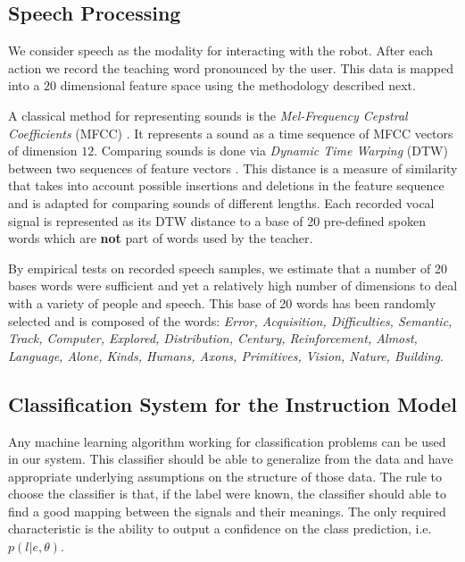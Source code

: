 \subsection{Speech Processing}

We consider speech as the modality for interacting with the robot. After each action we record the teaching word pronounced by the user. This data is mapped into a $20$ dimensional feature space using the methodology described next.  

A classical method for representing sounds is the \textit{Mel-Frequency Cepstral Coefficients} (MFCC) \cite{zheng2001comparison}. It represents a sound as a time sequence of MFCC vectors of dimension $12$. Comparing sounds is done via \textit{Dynamic Time Warping} (DTW) between two sequences of feature vectors \cite{sakoe1978dynamic}. This distance is a measure of similarity that takes into account possible insertions and deletions in the feature sequence and is adapted for comparing sounds of different lengths. Each recorded vocal signal is represented as its DTW distance to a base of 20 pre-defined spoken words which are \textbf{not} part of words used by the teacher.

By empirical tests on recorded speech samples, we estimate that a number of 20 bases words were sufficient and yet a relatively high number of dimensions to deal with a variety of people and speech. This base of 20 words has been randomly selected and is composed of the words:\emph{ \footnotesize{Error, Acquisition, Difficulties, Semantic, Track, Computer, Explored, Distribution, Century, Reinforcement, Almost, Language, Alone, Kinds, Humans, Axons, Primitives, Vision, Nature, Building}}.

\subsection{Classification System for the Instruction Model}

Any machine learning algorithm working for classification problems can be used in our system. This classifier should be able to generalize from the data and have appropriate underlying assumptions on the structure of those data. The rule to choose the classifier is that, if the label were known, the classifier should able to find a good mapping between the signals and their meanings. The only required characteristic is the ability to output a confidence on the class prediction, i.e. $p(l|e, \theta)$.

